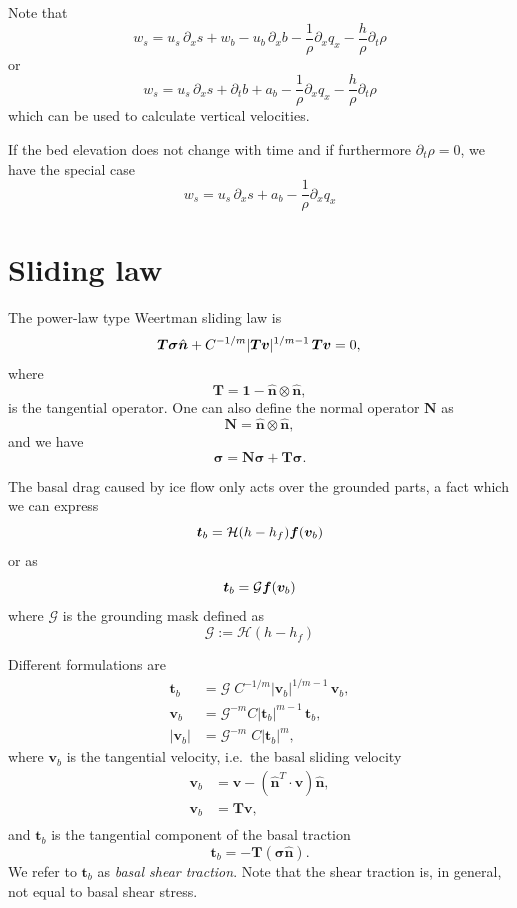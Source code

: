 \documentclass[10pt,a4paper]{book}
\newcommand{\He}{\mathcal{H}}
\newcommand{\G}{\mathcal{G}}
\newcommand{\p}{\partial}
\newcommand{\normal}{\hat{\bm{n}}}
\begin{document}
Note that
\[
w_s = u_s \, \p_x s +w_b - u_b \, \p_x b - \frac{1}{\rho} \p_x q_x - \frac{h}{\rho} \p_t \rho 
\]
or
\[
w_s = u_s \, \p_x s + \p_t b + a_b  - \frac{1}{\rho} \p_x q_x - \frac{h}{\rho} \p_t \rho 
\]
which can be used to calculate vertical velocities. 

If the bed elevation does not change with time and if furthermore
$\p_t \rho=0$, we have the special case
\[
w_s = u_s \, \p_x s + a_b  - \frac{1}{\rho} \p_x q_x 
\]



\section{Sliding law}
The power-law type Weertman sliding law is
\[
\bm{T} \bm{\sigma} \normal  + C^{-1/m} |\bm{T} \bm{v}|^{1/m-1} \, \bm{T} \bm{v} =0 ,\\
\]
where 
\[ 
\bm{T}= \bm{1} - \normal \otimes \normal ,
\]
is the tangential operator.  One can also define the normal operator $\bm{N}$ as
\[
\bm{N}= \normal \otimes \normal ,
\]
and we have
\[
\bm{\sigma}= \bm{N} \bm{\sigma} + \bm{T} \bm{\sigma} .
\]

The basal drag caused by ice flow only acts over the grounded parts, a
fact which we can express
\[
\bm{t}_b  = \He(h-h_f) \bm{f}(\bm{v}_b)\\
\]
or as
\[
\bm{t}_b  = \G \bm{f}(\bm{v}_b)\\
\]
where
$\G$ is the grounding mask defined as
 \[
\G:=\He(h-h_f)
\]

Different formulations are
\begin{align}
\bm{t}_b  & = \G \; C^{-1/m} | \bm{v}_b|^{1/m-1} \, \bm{v}_b ,\label{eq:slida} \\
\bm{v}_b  & = \G^{-m} C | \bm{t}_b|^{m-1} \, \bm{t}_b ,\label{eq:slidb} \\
|\bm{v}_b|& = \G^{-m} \; C  | \bm{t}_b|^{m}  ,\label{eq:slidc}
\end{align}
where
$\bm{v}_b$ is the tangential velocity, i.e.\ the basal sliding velocity
\begin{align*}
\bm{v}_b&=\bm{v}-(\normal^T \cdot \bm{v}) \normal ,\\
\bm{v}_b&=\bm{T} \bm{v} ,\\
\end{align*}
and $\bm{t}_b$ is the tangential component of the basal traction
\[
\bm{t}_b = -\bm{T} (\bm{\sigma}  \normal) . 
\]
We refer to $\bm{t}_b$ as {\em basal shear traction}.  Note that the
shear traction is, in general, not equal to basal shear stress.
\end{document}
